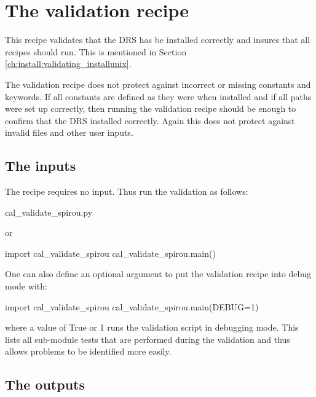 \clearpage
\newpage
\section{The validation recipe}
\label{ch:the_recipes:cal_validate_spirou}

This recipe validates that the DRS has be installed correctly and insures that all recipes should run. This is mentioned in Section \ref{ch:install:validating_installunix}.
\begin{note}
The validation recipe does not protect against incorrect or missing constants and keywords. If all constants are defined as they were when installed and if all paths were set up correctly, then running the validation recipe should be enough to confirm that the DRS installed correctly. Again this does not protect against invalid files and other user inputs.
\end{note}

\subsection{The inputs}
The \calvalidate recipe requires no input. Thus run the validation as follows:
\begin{cmdbox}
cal_validate_spirou.py
\end{cmdbox}
\noindent or
\begin{pythonbox}
import cal_validate_spirou
cal_validate_spirou.main()
\end{pythonbox}
\noindent One can also define an optional argument to put the validation recipe into debug mode with:
\begin{pythonbox}
import cal_validate_spirou
cal_validate_spirou.main(DEBUG=1)
\end{pythonbox}
\noindent where a value of True or 1 runs the validation script in debugging mode. This lists all sub-module tests that are performed during the validation and thus allows problems to be identified more easily.

\subsection{The outputs}

